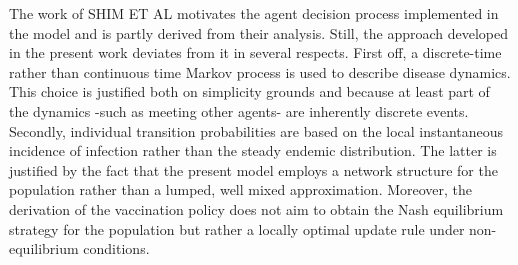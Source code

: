 \documentclass[11pt]{article}
\begin{document}
The work of SHIM ET AL motivates the agent decision process implemented in the model and is partly derived from their analysis. Still, the approach developed in the present work deviates from it in several respects. First off, a discrete-time rather than continuous time Markov process is used to describe disease dynamics. This choice is justified both on simplicity grounds and because at least part of the dynamics -such as meeting other agents- are inherently discrete events. Secondly, individual transition probabilities are based on the local instantaneous incidence of infection rather than the steady endemic distribution. The latter is justified by the fact that the present model employs a network structure for the population rather than a lumped, well mixed approximation. Moreover, the derivation of the vaccination policy does not aim to obtain the Nash equilibrium strategy for the population but rather a locally optimal update rule under non-equilibrium conditions.
\end{document}
